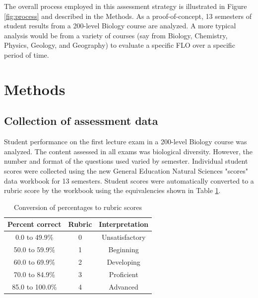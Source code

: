 \documentclass[fleqn,10pt]{SelfArx}\usepackage[]{graphicx}\usepackage[]{color}
\begin{document}
The overall process employed in this assessment strategy is illustrated in Figure \ref{fig:process} and described in the Methods. As a proof-of-concept, 13 semesters of student results from a 200-level Biology course are analyzed. A more typical analysis would be from a variety of courses (say from Biology, Chemistry, Physics, Geology, and Geography) to evaluate a specific FLO over a specific period of time.

\section{Methods}

\subsection{Collection of assessment data}
Student performance on the first lecture exam in a 200-level Biology course was analyzed. The content assessed in all exams was biological diversity. However, the number and format of the questions used varied by semester. Individual student scores were collected using the new General Education Natural Sciences "scores" data workbook for 13 semesters. Student scores were automatically converted to a rubric score by the workbook using the equivalencies shown in Table \ref{tab:convert}.

\begin{table}[hbt]
\caption{Conversion of percentages to rubric scores}
\centering
\begin{tabular}{c c c}
\textbf{Percent correct} & \textbf{Rubric} & \textbf{Interpretation}   \\
\hline
 0.0 to 49.9\%   &   0   &   Unsatisfactory                                \\
50.0 to 59.9\%   &   1   &   Beginning                                     \\
60.0 to 69.9\%   &   2   &   Developing                                    \\
70.0 to 84.9\%   &   3   &   Proficient                                    \\
85.0 to 100.0\%  &   4   &   Advanced                                      \\
\end{tabular}
\label{tab:convert}
\end{table}
\end{document}
